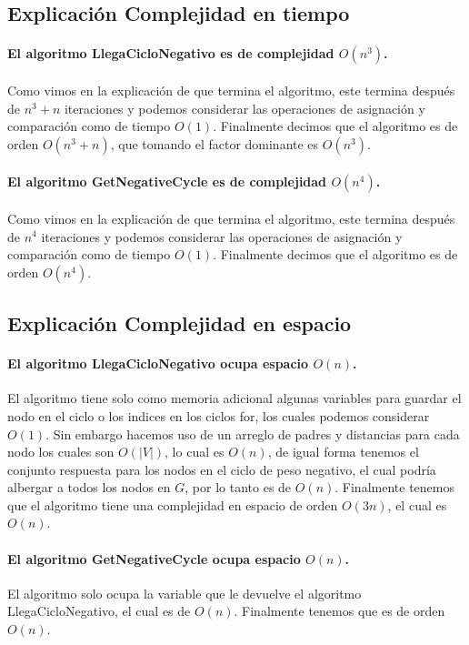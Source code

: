 \documentclass[12pt]{article}
\begin{document}
\subsection{Explicación Complejidad en tiempo}
\paragraph{El algoritmo LlegaCicloNegativo es de complejidad $O(n^3)$.}
Como vimos en la explicación de que termina el algoritmo, este termina después de $n^3+n$ iteraciones y podemos considerar las operaciones de asignación y comparación como de tiempo $O(1)$. Finalmente decimos que el algoritmo es de orden $O(n^3 + n)$, que tomando el factor dominante es $O(n^3)$.
\paragraph{El algoritmo GetNegativeCycle es de complejidad $O(n^4)$.}
Como vimos en la explicación de que termina el algoritmo, este termina después de $n^4$ iteraciones y podemos considerar las operaciones de asignación y comparación como de tiempo $O(1)$. Finalmente decimos que el algoritmo es de orden $O(n^4)$.
\subsection{Explicación Complejidad en espacio}
\paragraph{El algoritmo LlegaCicloNegativo ocupa espacio $O(n)$.}
El algoritmo tiene solo como memoria adicional algunas variables para guardar el nodo en el ciclo o los indices en los ciclos for, los cuales podemos considerar $O(1)$. Sin embargo hacemos uso de un arreglo de padres y distancias para cada nodo los cuales son $O(|V|)$, lo cual es $O(n)$, de igual forma tenemos el conjunto respuesta para los nodos en el ciclo de peso negativo, el cual podría albergar a todos los nodos en $G$, por lo tanto es de $O(n)$. Finalmente tenemos que el algoritmo tiene una complejidad en espacio de orden $O(3n)$, el cual es $O(n)$.
\paragraph{El algoritmo GetNegativeCycle ocupa espacio $O(n)$.}
El algoritmo solo ocupa la variable que le devuelve el algoritmo LlegaCicloNegativo, el cual es de $O(n)$. Finalmente tenemos que es de orden $O(n)$.
\end{document}
